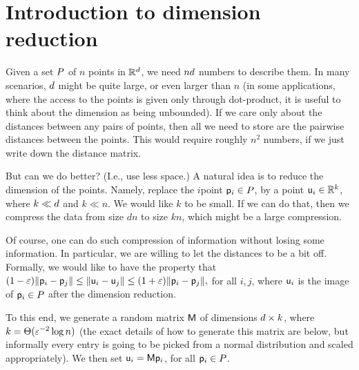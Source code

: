 

%




\ChapterPrefix{}
\ChapterGen{}


\section{Introduction to dimension reduction}

Given a set $P$ of $n$ points in $\mathbb{R}^d$, we need $nd$
numbers to describe them. In many scenarios, $d$ might be quite
large, or even larger than $n$ (in some applications, where the access
to the points is given only through dot-product, it is useful to think
about the dimension as being unbounded). If we care only about the
distances between any pairs of points, then all we need to store are
the pairwise distances between the points. This would require roughly
$n^2$ numbers, if we just write down the distance matrix.

But can we do better? (I.e., use less space.) A natural idea is to
reduce the dimension of the points. Namely, replace the $i$\th point
$\mathsf{p}_i \in P$, by a point $\mathsf{u}_i \in \mathbb{R}^k$, where $k \ll d$
and $k \ll n$. We would like $k$ to be small. If we can do that, then
we compress the data from size $dn$ to size $kn$, which might be a
large compression.

Of course, one can do such compression of information without losing
some information. In particular, we are willing to let the distances
to be a bit off. Formally, we would like to have the property that
\begin{math}
    (1-\eps)\|{\pnt_i - \pnt_j}\|%
    \leq%
    \|{\pntA_i - \pntA_j}\|%
    \leq%
    (1+\eps)\|{\pnt_i - \pnt_j}\|,
\end{math}
for all $i,j$, where $\mathsf{u}_i$ is the image of $\mathsf{p}_i \in P$ after
the dimension reduction.

To this end, we generate a random matrix $\mathsf{M}$ of dimensions
$d \times k$, where $k = \Theta({\varepsilon}^{-2} \log n)$ (the exact
details of how to generate this matrix are below, but informally every
entry is going to be picked from a normal distribution and scaled
appropriately).  We then set $\mathsf{u}_i = \mathsf{M} \mathsf{p}_i$, for all
$\mathsf{p}_i \in P$.

